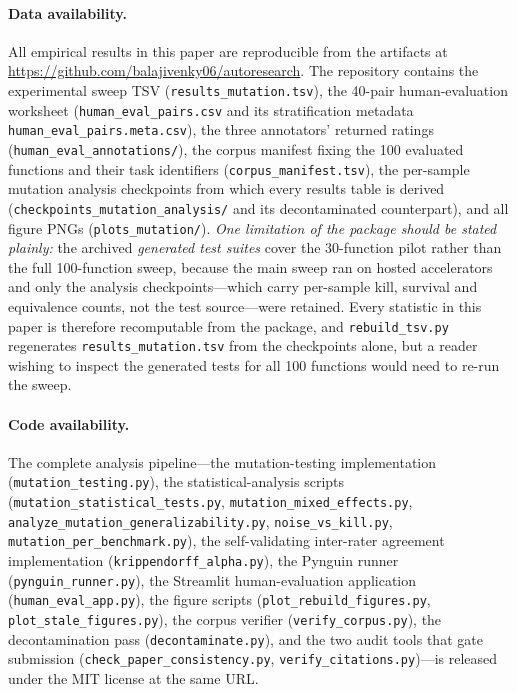 \documentclass[smallextended]{svjour3}
\begin{document}
\paragraph{Data availability.}
All empirical results in this paper are reproducible from the
artifacts at
\url{https://github.com/balajivenky06/autoresearch}. The
repository contains the experimental sweep TSV
(\texttt{results\_mutation.tsv}), the 40-pair human-evaluation
worksheet (\texttt{human\_eval\_pairs.csv} and its stratification
metadata \texttt{human\_eval\_pairs.meta.csv}), the three annotators'
returned ratings (\texttt{human\_eval\_annotations/}), the corpus
manifest fixing the 100 evaluated functions and their task
identifiers (\texttt{corpus\_manifest.tsv}), the per-sample mutation
analysis checkpoints from which every results table is derived
(\texttt{checkpoints\_mutation\_analysis/} and its decontaminated
counterpart), and all figure PNGs (\texttt{plots\_mutation/}).
\emph{One limitation of the package should be stated plainly:} the
archived \emph{generated test suites} cover the 30-function pilot
rather than the full 100-function sweep, because the main sweep ran
on hosted accelerators and only the analysis checkpoints---which
carry per-sample kill, survival and equivalence counts, not the test
source---were retained. Every statistic in this paper is therefore
recomputable from the package, and \texttt{rebuild\_tsv.py}
regenerates \texttt{results\_mutation.tsv} from the checkpoints
alone, but a reader wishing to inspect the generated tests for all
100 functions would need to re-run the sweep.

\paragraph{Code availability.}
The complete analysis pipeline—the mutation-testing implementation
(\texttt{mutation\_testing.py}), the statistical-analysis scripts
(\texttt{mutation\_statistical\_tests.py},
\texttt{mutation\_mixed\_effects.py},
\texttt{analyze\_mutation\_generalizability.py},
\texttt{noise\_vs\_kill.py},
\texttt{mutation\_per\_benchmark.py}), the self-validating
inter-rater agreement implementation
(\texttt{krippendorff\_alpha.py}), the Pynguin runner
(\texttt{pynguin\_runner.py}), the Streamlit human-evaluation
application (\texttt{human\_eval\_app.py}), the figure scripts
(\texttt{plot\_rebuild\_figures.py},
\texttt{plot\_stale\_figures.py}), the corpus verifier
(\texttt{verify\_corpus.py}), the decontamination pass
(\texttt{decontaminate.py}), and the two audit tools that gate
submission (\texttt{check\_paper\_consistency.py},
\texttt{verify\_citations.py})—is released under the MIT license at
the same URL.
\end{document}
